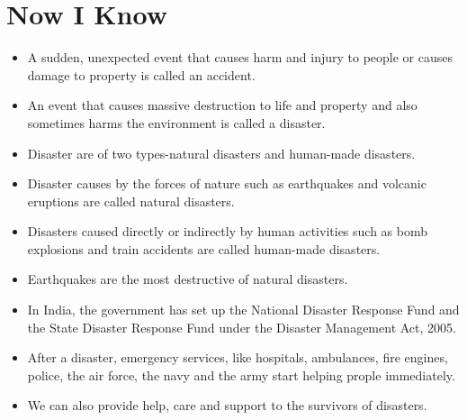 \section{Now I Know}
\begin{itemize}
    \item A sudden, unexpected event that causes harm and injury to people or causes damage to property is called an accident.
    \item An event that causes massive destruction to life and property and also sometimes harms the environment is called a disaster.
    \item Disaster are of two types-natural disasters and human-made disasters.
    \item Disaster causes by the forces of nature such as earthquakes and volcanic eruptions are called natural disasters.
    \item Disasters caused directly or indirectly by human activities such as bomb explosions and train accidents are called human-made disasters.
    \item Earthquakes are the most destructive of natural disasters.
    \item In India, the government has set up the National Disaster Response Fund and the State Disaster Response Fund under the Disaster Management Act, 2005.
    \item After a disaster, emergency services, like hospitals, ambulances, fire engines, police, the air force, the navy and the army start helping prople immediately.
    \item We can also provide help, care and support to the survivors of disasters.
\end{itemize}